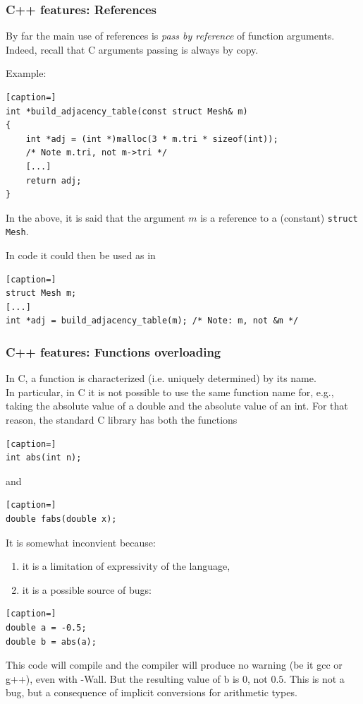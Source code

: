\documentclass[8pt]{beamer}
\begin{document}
\begin{frame}[containsverbatim]
\frametitle{C++ features: References}

By far the main use of references is {\it pass by reference} of function
arguments. Indeed, recall that C arguments passing is always by copy.

\medskip

Example:\\[3pt]

\begin{lstlisting}[caption=]
int *build_adjacency_table(const struct Mesh& m)
{
	int *adj = (int *)malloc(3 * m.tri * sizeof(int));
	/* Note m.tri, not m->tri */
	[...]
	return adj;
}
\end{lstlisting}

In the above, it is said that the argument $m$ is a reference to a (constant) {\tt struct
Mesh}.

\medskip

In code it could then be used as in

\begin{lstlisting}[caption=]
struct Mesh m;
[...]
int *adj = build_adjacency_table(m); /* Note: m, not &m */
\end{lstlisting}



\end{frame}

\begin{frame}[containsverbatim]
\frametitle{C++ features: Functions overloading}

In C, a function is characterized (i.e. uniquely determined) by its name.\\


In particular, in C it is not possible to use the same function name for, e.g., 
taking the absolute value of a double and the absolute value of an int. 
For that reason, the standard C library has both the functions
\begin{lstlisting}[caption=]
int abs(int n);
\end{lstlisting}
and
\begin{lstlisting}[caption=]
double fabs(double x);
\end{lstlisting}

It is somewhat inconvient because:
\begin{enumerate}
 \item it is a limitation of expressivity of the language,
 \item it is a possible source of bugs:
 \end{enumerate}
\begin{lstlisting}[caption=]
double a = -0.5;
double b = abs(a);
\end{lstlisting}
This code will compile and the compiler will produce no warning (be it gcc or
g++), even with -Wall. But the resulting value of b is $0$, not $0.5$. This is
not a bug, but a consequence of implicit conversions for arithmetic types.
\end{frame}
\end{document}
